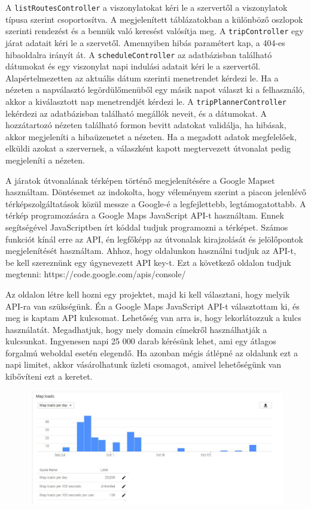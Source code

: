 A \texttt{listRoutesController} a viszonylatokat kéri le a szervertől a viszonylatok típusa szerint csoportosítva. A megjelenített táblázatokban a különböző oszlopok szerinti rendezést és a bennük való keresést valósítja meg.
A \texttt{tripController} egy járat adatait kéri le a szervetől. Amennyiben hibás paramétert kap, a 404-es hibaoldalra irányít át.
A \texttt{scheduleController} az adatbázisban található dátumokat és egy viszonylat napi indulási adatait kéri le a szervertől. Alapértelmezetten az aktuális dátum szerinti menetrendet kérdezi le. Ha a nézeten a napválasztó legördülőmenüből egy másik napot választ ki a felhasználó, akkor a kiválasztott nap menetrendjét kérdezi le.
A \texttt{tripPlannerController} lekérdezi az adatbázisban található megállók neveit, és a dátumokat. A hozzátartozó nézeten található formon bevitt adatokat validálja, ha hibásak, akkor megjeleníti a hibaüzenetet a nézeten. Ha a megadott adatok megfelelőek, elküldi azokat a szervernek, a válaszként kapott megtervezett útvonalat pedig megjeleníti a nézeten.


A járatok útvonalának térképen történő megjelenítésére a Google Mapset használtam. Döntésemet az indokolta, hogy véleményem szerint a piacon jelenlévő térképszolgáltatások közül messze a Google-é a legfejlettebb, legtámogatottabb. A térkép programozására a Google Maps JavaScript API-t használtam. Ennek segítségével JavaScriptben írt kóddal tudjuk programozni a térképet. Számos funkciót kínál erre az API, én legfőképp az útvonalak kirajzolását és jelölőpontok megjelenítését használtam. Ahhoz, hogy oldalunkon használni tudjuk az API-t, be kell szereznünk egy úgynevezett API key-t. Ezt a következő oldalon tudjuk megtenni: https://code.google.com/apis/console/

Az oldalon létre kell hozni egy projektet, majd ki kell választani, hogy melyik API-ra van szükségünk. Én a Google Maps JavaScript API-t választottam ki, és meg is kaptam API kulcsomat. Lehetőség van arra is, hogy lekorlátozzuk a kulcs használatát. Megadhatjuk, hogy mely domain címekről használhatják a kulcsunkat. Ingyenesen napi 25 000 darab kérésünk lehet, ami egy átlagos forgalmú weboldal esetén elegendő. Ha azonban mégis átlépné az oldalunk ezt a napi limitet, akkor vásárolhatunk üzleti csomagot, amivel lehetőségünk van kibővíteni ezt a keretet.

\begin{figure}[h!]
\centering
\includegraphics[scale=0.5]{kepek/google_maps_api_1.jpg}
\caption{}
\label{fig:google_maps_api_1}
\end{figure}

